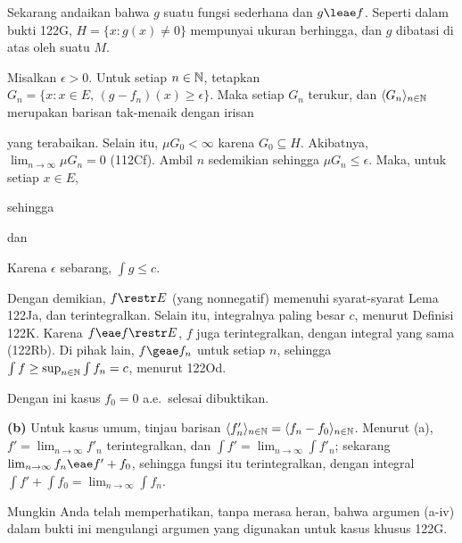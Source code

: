 {\medskip

Sekarang andaikan bahwa $g$ suatu fungsi sederhana dan $g\leae f$.
Seperti dalam bukti 122G, $H=\{x:g(x)\ne 0\}$ mempunyai ukuran
berhingga, dan $g$ dibatasi di atas oleh suatu $M$.

Misalkan $\epsilon>0$. Untuk setiap $n\in\Bbb N$, tetapkan
$G_n=\{x:x\in E,\,(g-f_n) (x)\ge\epsilon\}$.
Maka setiap $G_n$ terukur, dan $\langle G_n \rangle_{n\in\Bbb N}$
merupakan barisan tak-menaik dengan irisan


\noindent yang terabaikan.
Selain itu, $\mu G_0<\infty$ karena $G_0\subseteq H$.
Akibatnya, $\lim_{n\to\infty}\mu G_n=0$ (112Cf).
Ambil $n$ sedemikian sehingga $\mu G_n\le\epsilon$. Maka, untuk setiap
$x\in E$,


\noindent sehingga


\noindent dan


\noindent Karena $\epsilon$ sebarang, $\int g\le c$.

\medskip

 Dengan demikian, $f\restr E$ (yang nonnegatif)
memenuhi syarat-syarat Lema 122Ja, dan terintegralkan. Selain itu,
integralnya paling besar $c$, menurut Definisi 122K. Karena
$f\eae f\restr E$, $f$ juga terintegralkan, dengan integral yang sama
(122Rb). Di pihak lain, $f\geae f_n$ untuk setiap $n$, sehingga
$\int f\ge\sup_{n\in\Bbb N}\int f_n=c$, menurut 122Od.

Dengan ini kasus $f_0=0$ a.e.\ selesai dibuktikan.

\medskip

{\bf (b)} Untuk kasus umum, tinjau barisan
$\langle f'_n\rangle_{n\in\Bbb N}=\langle f_n-f_0\rangle_{n\in\Bbb N}$.
Menurut (a), $f'=\lim_{n\to\infty}f'_n$ terintegralkan, dan
$\int f'=\lim_{n\to\infty}
\int f'_n$; sekarang
$\lim_{n\to\infty}f_n\eae f'+f_0$, sehingga fungsi itu terintegralkan,
dengan integral
$\int f'+\int f_0=\lim_{n\to\infty}\int f_n$.

\medskip

 Mungkin Anda telah memperhatikan, tanpa merasa
heran, bahwa argumen (a-iv) dalam bukti ini mengulangi argumen yang
digunakan untuk kasus khusus 122G.
}%

